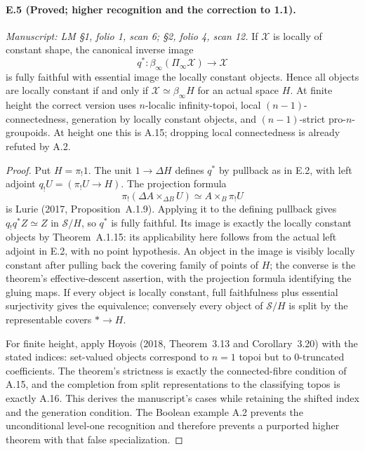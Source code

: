 \paragraph{E.5 (Proved; higher recognition and the correction to 1.1).}
\textit{Manuscript: LM \S1, folio 1, scan 6; \S2, folio 4, scan 12.}
If $\mathcal X$ is locally of constant shape, the canonical inverse image
\[
 q^*:\beta_\infty(\Pi_\infty\mathcal X)\longrightarrow\mathcal X
\]
is fully faithful with essential image the locally constant objects. Hence all objects are locally constant if and only if $\mathcal X\simeq\beta_\infty H$ for an actual space $H$. At finite height the correct version uses $n$-localic infinity-topoi, local $(n-1)$-connectedness, generation by locally constant objects, and $(n-1)$-strict pro-$n$-groupoids. At height one this is A.15; dropping local connectedness is already refuted by A.2.
\begin{proof}
Put $H=\pi_!1$. The unit $1\to\Delta H$ defines $q^*$ by pullback as in E.2, with left adjoint $q_!U=(\pi_!U\to H)$. The projection formula
\[
 \pi_!(\Delta A\times_{\Delta B}U)
                      \simeq A\times_B\pi_!U
\]
is Lurie (2017, Proposition~A.1.9). Applying it to the defining pullback gives $q_!q^*Z\simeq Z$ in $\mathcal S/H$, so $q^*$ is fully faithful. Its image is exactly the locally constant objects by Theorem~A.1.15: its applicability here follows from the actual left adjoint in E.2, with no point hypothesis. An object in the image is visibly locally constant after pulling back the covering family of points of $H$; the converse is the theorem's effective-descent assertion, with the projection formula identifying the gluing maps. If every object is locally constant, full faithfulness plus essential surjectivity gives the equivalence; conversely every object of $\mathcal S/H$ is split by the representable covers $*\to H$.

For finite height, apply Hoyois (2018, Theorem~3.13 and Corollary~3.20) with the stated indices: set-valued objects correspond to $n=1$ topoi but to $0$-truncated coefficients. The theorem's strictness is exactly the connected-fibre condition of A.15, and the completion from split representations to the classifying topos is exactly A.16. This derives the manuscript's cases while retaining the shifted index and the generation condition. The Boolean example A.2 prevents the unconditional level-one recognition and therefore prevents a purported higher theorem with that false specialization. 
\end{proof}

